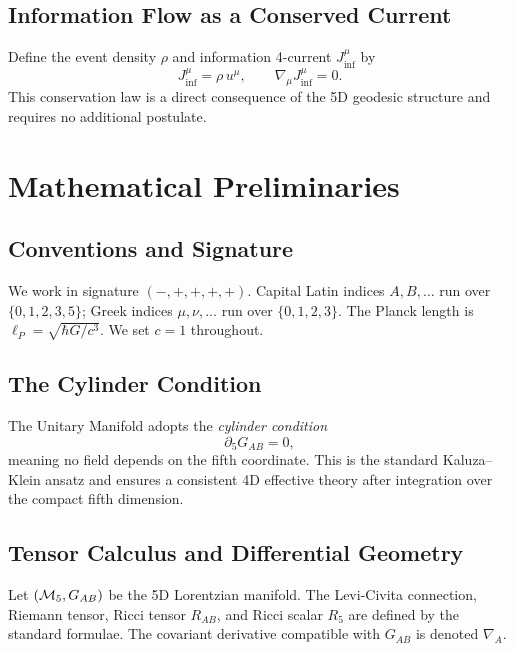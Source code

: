 \documentclass[12pt,a4paper]{article}
\newcommand{\Jinf}{J_{\inf}^{\mu}} %
\newcommand{\lP}{\ell_P}           %
\begin{document}
\subsection{Information Flow as a Conserved Current}

Define the event density $\rho$ and information 4-current $\Jinf$ by
\begin{equation}
  \Jinf = \rho\, u^{\mu}, \qquad \nabla_\mu \Jinf = 0 .
  \label{eq:info-conservation}
\end{equation}
This conservation law is a direct consequence of the 5D geodesic structure and
requires no additional postulate.

\section{Mathematical Preliminaries}
\label{sec:math-prelim}

\subsection{Conventions and Signature}

We work in signature $(-,+,+,+,+)$.  Capital Latin indices $A,B,\ldots$ run
over $\{0,1,2,3,5\}$; Greek indices $\mu,\nu,\ldots$ run over $\{0,1,2,3\}$.
The Planck length is $\lP = \sqrt{\hbar G/c^3}$.  We set $c=1$ throughout.

\subsection{The Cylinder Condition}

The Unitary Manifold adopts the \emph{cylinder condition}
\begin{equation}
  \partial_5 G_{AB} = 0,
  \label{eq:cylinder}
\end{equation}
meaning no field depends on the fifth coordinate.  This is the standard
Kaluza--Klein ansatz \citep{Kaluza1921,Klein1926} and ensures a consistent
4D effective theory after integration over the compact fifth dimension.

\subsection{Tensor Calculus and Differential Geometry}

Let $({\cal M}_5, G_{AB})$ be the 5D Lorentzian manifold.  The Levi-Civita
connection, Riemann tensor, Ricci tensor $R_{AB}$, and Ricci scalar $R_5$ are
defined by the standard formulae.  The covariant derivative compatible with
$G_{AB}$ is denoted $\nabla_A$.
\end{document}
